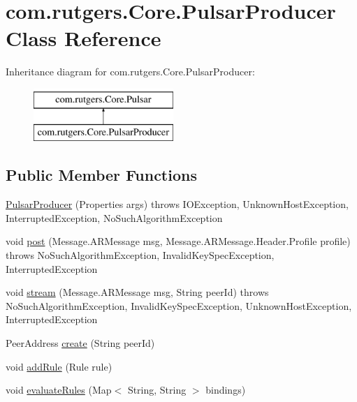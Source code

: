 \hypertarget{classcom_1_1rutgers_1_1Core_1_1PulsarProducer}{}\section{com.\+rutgers.\+Core.\+Pulsar\+Producer Class Reference}
\label{classcom_1_1rutgers_1_1Core_1_1PulsarProducer}
Inheritance diagram for com.\+rutgers.\+Core.\+Pulsar\+Producer\+:\begin{figure}[H]
\begin{center}
\leavevmode
\includegraphics[height=2.000000cm]{classcom_1_1rutgers_1_1Core_1_1PulsarProducer}
\end{center}
\end{figure}
\subsection*{Public Member Functions}
\begin{DoxyCompactItemize}
\item 
\hyperlink{classcom_1_1rutgers_1_1Core_1_1PulsarProducer_a0e4b3d1d8cc83b2f0e41dbaf54a5ccfd}{Pulsar\+Producer} (Properties args)  throws I\+O\+Exception, Unknown\+Host\+Exception, Interrupted\+Exception, No\+Such\+Algorithm\+Exception 
\item 
void \hyperlink{classcom_1_1rutgers_1_1Core_1_1PulsarProducer_a70606e1822ba0cc38aa73516cc85a88a}{post} (Message.\+A\+R\+Message msg, Message.\+A\+R\+Message.\+Header.\+Profile profile)  throws No\+Such\+Algorithm\+Exception, Invalid\+Key\+Spec\+Exception, Interrupted\+Exception 
\item 
void \hyperlink{classcom_1_1rutgers_1_1Core_1_1PulsarProducer_af1cc9b050071a1089fc41fd86f83e694}{stream} (Message.\+A\+R\+Message msg, String peer\+Id)  throws No\+Such\+Algorithm\+Exception, Invalid\+Key\+Spec\+Exception, Unknown\+Host\+Exception, Interrupted\+Exception 
\item 
Peer\+Address \hyperlink{classcom_1_1rutgers_1_1Core_1_1PulsarProducer_afeedb6a5b0d46a74d533c304dd07f4b8}{create} (String peer\+Id)
\item 
void \hyperlink{classcom_1_1rutgers_1_1Core_1_1PulsarProducer_ab05285fbc423061ac0de503fbb65b362}{add\+Rule} (Rule rule)
\item 
void \hyperlink{classcom_1_1rutgers_1_1Core_1_1PulsarProducer_a8b2667977e48345fcf4025aa1b6e0123}{evaluate\+Rules} (Map$<$ String, String $>$ bindings)
\end{DoxyCompactItemize}


